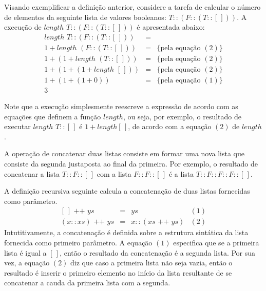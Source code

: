 \begin{Example}
Visando exemplificar a defini\c{c}\~ao anterior, considere a tarefa de calcular o n\'umero de elementos da seguinte lista de valores
booleanos: $T :: (F :: (T :: [\,]))$. A execu\c{c}\~ao de $length\,\,T :: (F :: (T :: [\,]))$ \'e apresentada abaixo:
\[
\begin{array}{lcl}
length\,\,T :: (F :: (T :: [\,])) & = & \\
1 + length\,\,(F :: (T :: [\,]))  & = & \{\text{pela equa\c{c}\~ao }(2)\}\\
1 + (1 + length\,\,(T :: [\,]))  & = & \{\text{pela equa\c{c}\~ao }(2)\}\\
1 + (1 + (1 + length\,\,[\,]))  & = & \{\text{pela equa\c{c}\~ao }(2)\}\\
1 + (1 + (1 + 0))  & = & \{\text{pela equa\c{c}\~ao }(1)\}\\
3                  &   & 
\end{array}
\]
\end{Example}

Note que a execu\c{c}\~ao simplesmente reescreve a express\~ao de acordo com as equa\c{c}\~oes que definem a fun\c{c}\~ao $length$, ou seja, por
exemplo, o resultado de executar $length\,\,T :: [\,]$  \'e $1 + length [\,]$, de acordo com a equa\c{c}\~ao $(2)$ de $length$.

A opera\c{c}\~ao de concatenar duas listas consiste em formar uma nova lista que consiste da segunda justaposta ao final da primeira. Por exemplo,
o resultado de concatenar a lista $T :: F :: [\,]$ com a lista $F :: F :: [\,]$ \'e a lista $T :: F :: F :: F :: [\,]$.

\begin{Definition}
 A defini\c{c}\~ao recursiva seguinte calcula a concatena\c{c}\~ao de duas listas fornecidas como par\^ametro. 
 \[
  \begin{array}{lclr}
    [\,] \text{ ++ } ys & = & ys & (1)\\
    (x :: xs) \text{ ++ } ys & = & x :: (xs \text{ ++ } ys) & (2)
  \end{array}
  \]
Intutitivamente, a concatena\c{c}\~ao \'e definida sobre a estrutura sint\'atica da lista fornecida como primeiro par\^ametro. A equa\c{c}\~ao 
$(1)$ especifica que se a primeira lista \'e igual a $[\,]$, ent\~ao o resultado da concatena\c{c}\~ao \'e a segunda lista. Por sua vez,
a equa\c{c}\~ao $(2)$ diz que caso a primeira lista n\~ao seja vazia, ent\~ao o resultado \'e inserir o primeiro elemento no in\'icio da lista
resultante de se concatenar a cauda da primeira lista com a segunda.
\end{Definition}


